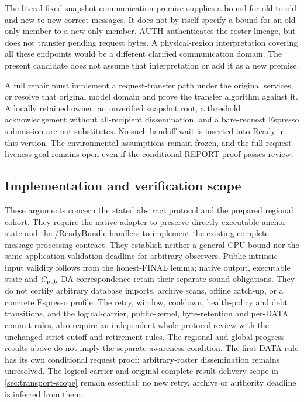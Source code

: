 The literal fixed-snapshot communication premise supplies a bound for
old-to-old and new-to-new correct messages. It does not by itself specify
a bound for an old-only member to a new-only member. AUTH authenticates
the roster lineage, but does not transfer pending request bytes. A
physical-region interpretation covering all these endpoints would be
a different clarified communication domain. The present candidate does
not assume that interpretation or add it as a new premise.

A full repair must implement a request-transfer path under the original
services, or resolve that original model domain and prove the transfer
algorithm against it. A locally retained owner, an unverified snapshot
root, a threshold acknowledgement without all-recipient dissemination,
and a bare-request Espresso submission are not substitutes. No such
handoff wait is inserted into Ready in this version. The environmental
assumptions remain frozen, and the full request-liveness goal remains
open even if the conditional REPORT proof passes review.

\subsection{Implementation and verification scope}
\label{sec:v35-progress-scope}
These arguments concern the stated abstract protocol and the prepared
regional cohort. They require the native adapter to preserve directly
executable anchor state and the /ReadyBundle handlers
to implement the existing complete-message processing contract. They
establish neither a general CPU bound nor the same application-validation
deadline for arbitrary observers. Public intrinsic input validity follows
from the honest-FINAL lemma; native output, executable state and
$C_{\rm pub}$ DA correspondence retain their separate sound obligations. They do not certify arbitrary database
imports, archive scans, offline catch-up, or a concrete Espresso profile.
The retry, window, cooldown, health-policy and debt transitions, and
the logical-carrier, public-kernel, byte-retention and per-DATA commit rules, also
require an independent whole-protocol review with the unchanged strict
cutoff and retirement rules. The regional and global progress results
above do not imply the separate awareness condition. The first-DATA
rule has its own conditional request proof; arbitrary-roster dissemination
remains unresolved. The logical carrier and original complete-result delivery scope in
\cref{sec:transport-scope} remain essential; no new retry, archive or
authority deadline is inferred from them.
